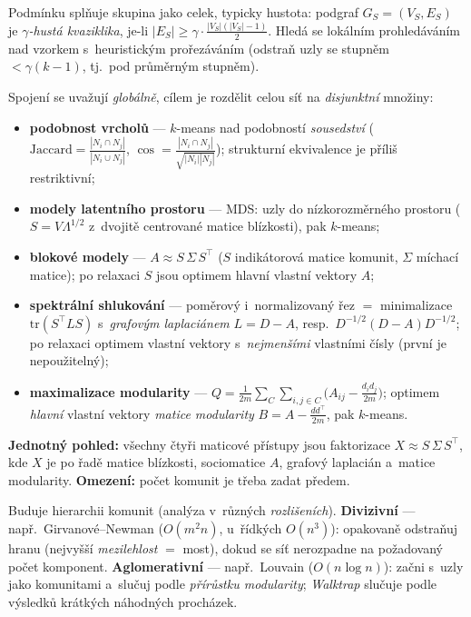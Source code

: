 \documentclass[11pt,a4paper]{article}
\theoremstyle{definition}
\begin{document}
\begin{defbox}
Podmínku splňuje skupina jako celek, typicky hustota: podgraf $G_S=(V_S,E_S)$ je
\emph{$\gamma$-hustá kvaziklika}, je-li $|E_S|\ge\gamma\cdot\frac{|V_S|(|V_S|-1)}{2}$.
Hledá se lokálním prohledáváním nad vzorkem s~heuristickým prořezáváním (odstraň uzly se
stupněm $<\gamma(k-1)$, tj.\ pod průměrným stupněm).
\end{defbox}

\begin{defbox}
Spojení se uvažují \emph{globálně}, cílem je rozdělit celou síť na \emph{disjunktní} množiny:
\begin{itemize}
\item \textbf{podobnost vrcholů} --- $k$-means nad podobností \emph{sousedství}
      ($\mathrm{Jaccard}=\frac{|N_i\cap N_j|}{|N_i\cup N_j|}$,
      $\cos=\frac{|N_i\cap N_j|}{\sqrt{|N_i||N_j|}}$); strukturní ekvivalence je příliš
      restriktivní;
\item \textbf{modely latentního prostoru} --- MDS: uzly do nízkorozměrného prostoru
      ($S=V\Lambda^{1/2}$ z~dvojitě centrované matice blízkosti), pak $k$-means;
\item \textbf{blokové modely} --- $A\approx S\,\Sigma\,S^{\!\top}$ ($S$ indikátorová matice
      komunit, $\Sigma$ míchací matice); po relaxaci $S$ jsou optimem hlavní vlastní
      vektory $A$;
\item \textbf{spektrální shlukování} --- poměrový i~normalizovaný řez $=$ minimalizace
      $\mathrm{tr}(S^{\!\top}LS)$ s~\emph{grafovým laplaciánem} $L=D-A$, resp.\
      $D^{-1/2}(D-A)D^{-1/2}$; po relaxaci optimem vlastní vektory s~\emph{nejmenšími}
      vlastními čísly (první je nepoužitelný);
\item \textbf{maximalizace modularity} --- $Q=\frac{1}{2m}\sum_C\sum_{i,j\in C}
      \big(A_{ij}-\frac{d_id_j}{2m}\big)$; optimem \emph{hlavní} vlastní vektory
      \emph{matice modularity} $B=A-\frac{dd^{\!\top}}{2m}$, pak $k$-means.
\end{itemize}
\textbf{Jednotný pohled:} všechny čtyři maticové přístupy jsou faktorizace
$X\approx S\,\Sigma\,S^{\!\top}$, kde $X$ je po řadě matice blízkosti, sociomatice $A$,
grafový laplacián a~matice modularity. \textbf{Omezení:} počet komunit je třeba zadat předem.
\end{defbox}

\begin{defbox}
Buduje hierarchii komunit (analýza v~různých \emph{rozlišeních}). \textbf{Divizivní} ---
např.\ Girvanové--Newman ($O(m^2n)$, u~řídkých $O(n^3)$): opakovaně odstraňuj
\uv{nejslabší} hranu (nejvyšší \emph{mezilehlost} $=$ most), dokud se síť nerozpadne na
požadovaný počet komponent. \textbf{Aglomerativní} --- např.\ Louvain ($O(n\log n)$):
začni s~uzly jako komunitami a~slučuj podle \emph{přírůstku modularity}; \emph{Walktrap}
slučuje podle výsledků krátkých náhodných procházek.
\end{defbox}
\end{document}
